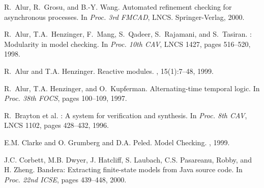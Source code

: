 \documentclass[10pt,twocolumn]{article}
\begin{document}
\small
\begin{thebibliography}{10}

\vspace{-1mm}
R.~Alur, R.~Grosu, and B.-Y. Wang.
\newblock Automated refinement checking for asynchronous processes.
\newblock In {\em Proc. 3rd FMCAD}, LNCS. Springer-Verlag, 2000.

\vspace{-1mm}
R.~Alur, T.A.~Henzinger, F.~Mang, S.~Qadeer, S.~Rajamani, and S.~Tasiran.
: Modularity in model checking.
\newblock In {\em Proc. 10th CAV}, LNCS 1427, pages 516--520, 1998.

\vspace{-1mm}
R.~Alur and T.A. Henzinger.
\newblock Reactive modules.
, 15(1):7--48, 1999.

\vspace{-1mm}
R.~Alur, T.A. Henzinger, and O.~Kupferman.
\newblock Alternating-time temporal logic.
\newblock In {\em Proc. 38th FOCS}, pages 100--109, 1997.



\vspace{-1mm}
R.~Brayton et al.
: A system for verification and synthesis.
\newblock In {\em Proc. 8th CAV}, LNCS 1102, pages 428--432, 
  1996.

\vspace{-1mm}
E.M. Clarke and O. Grumberg and D.A. Peled.
\newblock Model Checking.
, 1999.

\vspace{-1mm}
J.C. Corbett, M.B. Dwyer, J. Hatcliff, S. Laubach, C.S. Pasareanu, 
Robby, and H. Zheng.
\newblock Bandera: Extracting finite-state models from Java source code.
\newblock In {\em Proc. 22nd ICSE}, pages 439--448, 2000.


\end{thebibliography}
\end{document}
